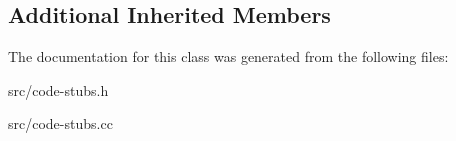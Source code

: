 \subsection*{Additional Inherited Members}


The documentation for this class was generated from the following files\+:\begin{DoxyCompactItemize}
\item 
src/code-\/stubs.\+h\item 
src/code-\/stubs.\+cc\end{DoxyCompactItemize}
